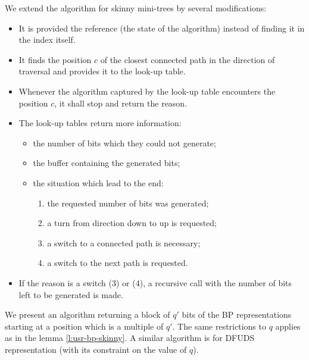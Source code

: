 We extend the algorithm for skinny mini-trees by several modifications:
\begin{itemize}
	\item It is provided the reference (the state of the algorithm) instead of finding it in the index itself.
	
	\item It finds the position $c$ of the closest connected path in the direction of traversal and provides it to the look-up table.
	
	\item Whenever the algorithm captured by the look-up table encounters the position $c$, it shall stop and return the reason.
	
	\item The look-up tables return more information:
	\begin{itemize}
		\item the number of bits which they could not generate;
		\item the buffer containing the generated bits;
		\item the situation which lead to the end:
		\begin{enumerate}
			\item the requested number of bits was generated;
			\item a turn from direction down to up is requested;
			\item a switch to a connected path is necessary;
			\item a switch to the next path is requested.
		\end{enumerate}
	\end{itemize}
	
	\item If the reason is a switch (3) or (4), a recursive call with the number of bits left to be generated is made.
\end{itemize}

We present an algorithm returning a block of $q'$ bits of the BP representations starting at a position which is a multiple of $q'$.
The same restrictions to $q$ applies as in the lemma \ref{l:usr-bp-skinny}.
A similar algorithm is for DFUDS representation (with its constraint on the value of $q$).

